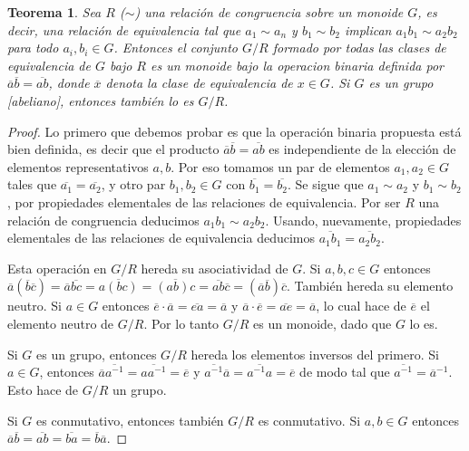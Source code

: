 \documentclass{report}
\newtheorem{theorem}{Teorema}
\theoremstyle{remark}
\begin{document}
  \begin{theorem}
    Sea \(R\) (\(\sim\)) una relación de congruencia sobre un monoide \(G\), es decir, una relación de equivalencia tal que \(a_1 \sim a_n\) y \(b_1 \sim b_2\) implican \(a_1 b_1 \sim a_2 b_2\) para todo \(a_i, b_i \in G\).
    Entonces el conjunto \(G / R\) formado por todas las clases de equivalencia de \(G\) bajo \(R\) es un monoide bajo la operacion binaria definida por \(\overline{a} \overline{b} = \overline{a b}\), donde \(\overline{x}\) denota la clase de equivalencia de \(x \in G\).
    Si \(G\) es un grupo [abeliano], entonces también lo es \(G / R\).
  \end{theorem}
  \begin{proof}
    Lo primero que debemos probar es que la operación binaria propuesta está bien definida, es decir que el producto \(\overline{a} \overline{b} = \overline{a b}\) es independiente de la elección de elementos representativos \(a, b\).
    Por eso tomamos un par de elementos \(a_1, a_2 \in G\) tales que \(\overline{a_1} = \overline{a_2}\), y otro par \(b_1, b_2 \in G\) con \(\overline{b_1} = \overline{b_2}\).
    Se sigue que \(a_1 \sim a_2\) y \(b_1 \sim b_2\), por propiedades elementales de las relaciones de equivalencia.
    Por ser \(R\) una relación de congruencia deducimos \(a_1 b_1 \sim a_2 b_2\).
    Usando, nuevamente, propiedades elementales de las relaciones de equivalencia deducimos \(\overline{a_1 b_1} = \overline{a_2 b_2}\).

    Esta operación en \(G / R\) hereda su asociatividad de \(G\).
    Si \(a, b, c \in G\) entonces
    \(
      \overline{a} (\overline{b} \overline{c})
      =
      \overline{a} \overline{b c}
      =
      \overline{a (b c)}
      =
      \overline{(a b) c}
      =
      \overline{a b} \overline{c}
      =
      (\overline{a} \overline{b}) \overline{c}
    \).
    También hereda su elemento neutro.
    Si \(a \in G\) entonces \(\overline{e}\cdot \overline{a} = \overline{e a} = \overline{a}\) y \(\overline{a} \cdot \overline{e} = \overline{a e} = \overline{a}\), lo cual hace de \(\overline{e}\) el elemento neutro de \(G / R\).
    Por lo tanto \(G / R\) es un monoide, dado que \(G\) lo es.

    Si \(G\) es un grupo, entonces \(G / R\) hereda los elementos inversos del primero.
    Si \(a \in G\), entonces \(\overline{a} \overline{a^{- 1}} = \overline{a a^{- 1}} = \overline{e}\) y \(\overline{a^{- 1}} \overline{a} = \overline{a^{- 1} a} = \overline{e}\) de modo tal que \(\overline{a^{-1}} = \overline{a}^{- 1}\).
    Esto hace de \(G / R\) un grupo.

    Si \(G\) es conmutativo, entonces también \(G / R\) es conmutativo.
    Si \(a, b \in G\) entonces \(\overline{a} \overline{b} = \overline{a b} = \overline{b a} = \overline{b} \overline{a}\).
  \end{proof}
\end{document}
